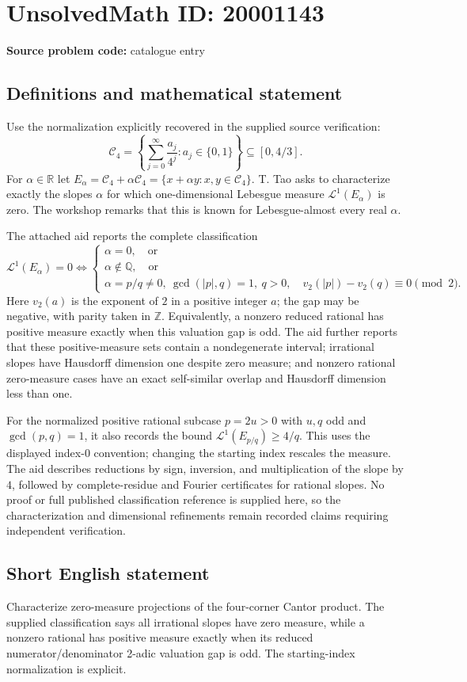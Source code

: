 \documentclass[11pt]{article}
\newcommand{\Z}{\mathbb{Z}}
\newcommand{\Q}{\mathbb{Q}}
\newcommand{\R}{\mathbb{R}}
\begin{document}
\section*{UnsolvedMath ID: 20001143}
\textbf{Source problem code:} catalogue entry
\subsection{Definitions and mathematical statement}
Use the normalization explicitly recovered in the supplied source verification:
\[
 \mathcal C_4=\left\{\sum_{j=0}^{\infty}\frac{a_j}{4^j}:a_j\in\{0,1\}\right\}\subseteq[0,4/3].
\]
For $\alpha\in\R$ let $E_\alpha=\mathcal C_4+\alpha\mathcal C_4=\{x+\alpha y:x,y\in\mathcal C_4\}$. T. Tao asks to characterize exactly the slopes $\alpha$ for which one-dimensional Lebesgue measure $\mathcal L^1(E_\alpha)$ is zero. The workshop remarks that this is known for Lebesgue-almost every real $\alpha$.

The attached aid reports the complete classification
\[
 \mathcal L^1(E_\alpha)=0
 \iff
 \begin{cases}
 \alpha=0,\quad\text{or}\\
 \alpha\notin\Q,\quad\text{or}\\
 \alpha=p/q\ne0,\ \gcd(|p|,q)=1,\ q>0,
 \quad v_2(|p|)-v_2(q)\equiv0\pmod2.
 \end{cases}
\]
Here $v_2(a)$ is the exponent of $2$ in a positive integer $a$; the gap may be negative, with parity taken in $\Z$. Equivalently, a nonzero reduced rational has positive measure exactly when this valuation gap is odd. The aid further reports that these positive-measure sets contain a nondegenerate interval; irrational slopes have Hausdorff dimension one despite zero measure; and nonzero rational zero-measure cases have an exact self-similar overlap and Hausdorff dimension less than one.

For the normalized positive rational subcase $p=2u>0$ with $u,q$ odd and $\gcd(p,q)=1$, it also records the bound $\mathcal L^1(E_{p/q})\geq4/q$. This uses the displayed index-$0$ convention; changing the starting index rescales the measure. The aid describes reductions by sign, inversion, and multiplication of the slope by $4$, followed by complete-residue and Fourier certificates for rational slopes. No proof or full published classification reference is supplied here, so the characterization and dimensional refinements remain recorded claims requiring independent verification.
\subsection{Short English statement}
Characterize zero-measure projections of the four-corner Cantor product. The supplied classification says all irrational slopes have zero measure, while a nonzero rational has positive measure exactly when its reduced numerator/denominator 2-adic valuation gap is odd. The starting-index normalization is explicit.
\end{document}
